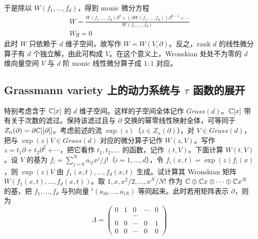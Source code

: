于是除以 $W(f_1,\dots,f_d)$，得到 monic 微分方程
\[
\begin{gathered}
W=\frac{W(f_1,\dots,f_d)\partial^d+(\partial W(f_1,\dots,f_d))\partial^{d-1}+\cdots}{W(f_1,\dots,f_d)}\\
Wg=0
\end{gathered}
\]
此时 $W$ 只依赖于 $d$ 维子空间，故写作 $W=W(V,\partial)$。反之，rank $d$ 的线性微分算子有 $d$ 个独立解，由此可构成 $V$。在这个意义上，Wronskian 处处不为零的 $d$ 维向量空间 $V$ 与 $d$ 阶 monic 线性微分算子成 $1:1$ 对应。

\subsection{Grassmann variety 上的动力系统与 $\tau$ 函数的展开}

特别考虑含于 $\mathbb{C}[x]$ 的 $d$ 维子空间。这样的子空间全体记作 $Grass(d)$。$\mathbb{C}[x]$ 带有关于次数的滤过。保持该滤过且与 $\partial$ 交换的幂零线性映射全体，可等同于 $Z_n(\partial)=\partial\mathbb{C}[[\partial]]$。考虑前述的流 $\exp(z)$（$z\in Z_n(\partial)$），对 $V\in Grass(d)$，把与 $\exp(z)V\in Grass(d)$ 对应的微分算子记作 $W(z,V)$。写作 $z=t_1\partial+t_2\partial^2+\cdots$，把它看作 $t_1,t_2,\dots$ 的函数，记作 $(t,V)$。下面计算 $W(t,V)$。设 $V$ 的基为 $f_i=\sum_{j=0}^N a_{ij}x^j/j!$（$i=1,\dots,d$），令 $f_i(x,t)=\exp(z)f_i(x)$，则 $\exp(z)V$ 由 $f_1(x,t),\dots,f_d(x,t)$ 生成。试计算其 Wronskian 矩阵 $W(f_1(x,t),\dots,f_d(x,t))$。取 $1,x,x^2/2,\dots,x^N/N!$ 作为 $\mathbb{C}\oplus\mathbb{C} x\oplus\cdots\oplus\mathbb{C} x^N$ 的基，把 $f_1,\dots,f_d$ 与列向量 ${}^{t}(a_{i0},\dots,a_{iN})$ 等同起来。此时若用矩阵表示 $\partial$，则为
\[
\Lambda=
\begin{pmatrix}
0 & 1 & 0 & \cdots & 0\\
 & & \cdots & & \\
0 & 0 & \cdots & 0 & 1\\
0 & 0 & \cdots & 0 & 0
\end{pmatrix}
\]

